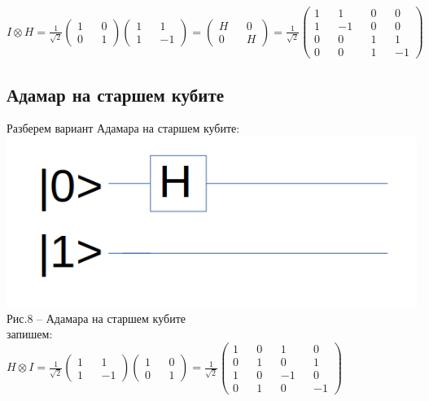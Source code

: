 \documentclass[11pt]{report}
\begin{document}
$I\otimes H = \frac{1}{\sqrt2}\begin{pmatrix}
1 && 0 \\
0 && 1\end{pmatrix} \begin{pmatrix}
1 && 1 \\
1 && -1\end{pmatrix} = \begin{pmatrix}
H && 0 \\
0 && H \end{pmatrix} = 
\frac{1}{\sqrt2}\begin{pmatrix}
1 && 1 && 0 && 0  \\
1 && -1 && 0 && 0 \\
0 && 0 && 1 && 1 \\
0 && 0 && 1 && -1
 \end{pmatrix}$
 
\subsection{Адамар на старшем кубите}
Разберем вариант Адамара на старшем кубите: \\

\includegraphics[scale=0.2]{adamar_st}\\
Рис.8 -- Адамара на старшем кубите \\

запишем: \\

$H\otimes I = \frac{1}{\sqrt2}\begin{pmatrix}
1 && 1 \\
1 && -1\end{pmatrix} 
\begin{pmatrix}
1 && 0 \\
0 && 1\end{pmatrix} = \frac{1}{\sqrt2}\begin{pmatrix}
1 && 0 && 1 && 0 \\
0 && 1 && 0 && 1 \\
1 && 0 && -1 && 0 \\
0 && 1 && 0 && -1\end{pmatrix}$
\end{document}
